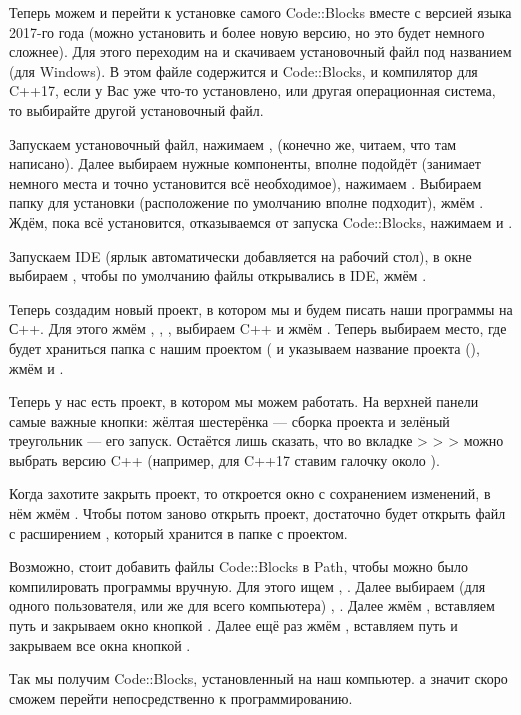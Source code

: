 Теперь можем и перейти к установке самого Code::Blocks вместе с версией языка 2017-го года (можно установить и более новую версию, но это будет немного сложнее). Для этого переходим на  и скачиваем установочный файл под названием  (для Windows). В этом файле содержится и Code::Blocks, и компилятор для C++17, если у Вас уже что-то установлено, или другая операционная система, то выбирайте другой установочный файл.

Запускаем установочный файл, нажимаем ,  (конечно же, читаем, что там написано). Далее выбираем нужные компоненты, вполне подойдёт  (занимает немного места и точно установится всё необходимое), нажимаем . Выбираем папку для установки (расположение по умолчанию вполне подходит), жмём . Ждём, пока всё установится, отказываемся от запуска Code::Blocks, нажимаем  и . 

Запускаем IDE (ярлык автоматически добавляется на рабочий стол), в окне  выбираем , чтобы по умолчанию файлы открывались в IDE, жмём .

Теперь создадим новый проект, в котором мы и будем писать наши программы на С++. Для этого жмём , , , выбираем C++ и жмём . Теперь выбираем место, где будет храниться папка с нашим проектом ( и указываем название проекта (), жмём  и .

Теперь у нас есть проект, в котором мы можем работать. На верхней панели самые важные кнопки: жёлтая шестерёнка — сборка проекта и зелёный треугольник — его запуск. Остаётся лишь сказать, что во вкладке  >  >  >  можно выбрать версию C++ (например, для C++17 ставим галочку около ).

Когда захотите закрыть проект, то откроется окно с сохранением изменений, в нём жмём . Чтобы потом заново открыть проект, достаточно будет открыть файл с расширением , который хранится в папке с проектом.

Возможно, стоит добавить файлы Code::Blocks в Path, чтобы можно было компилировать программы вручную. Для этого ищем , . Далее выбираем (для одного пользователя, или же для всего компьютера) , . Далее жмём , вставляем путь  и закрываем окно кнопкой . Далее ещё раз жмём , вставляем путь  и закрываем все окна кнопкой .

Так мы получим Code::Blocks, установленный на наш компьютер. а значит скоро сможем перейти непосредственно к программированию.
